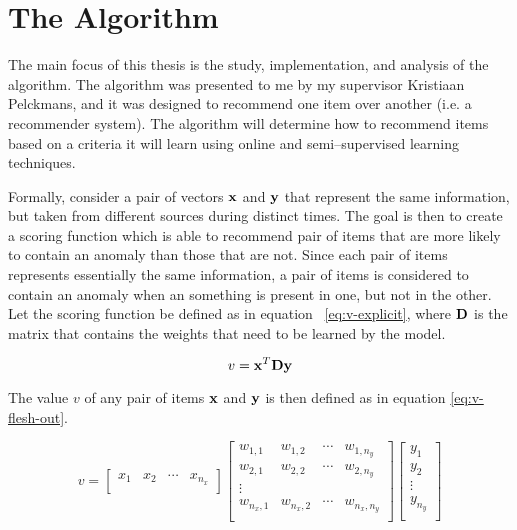 \section{The \mlblink Algorithm} \label{sect:theory:ml-blink}

The main focus of this thesis is the study, implementation, and analysis of the \mlblink algorithm. The \mlblink algorithm was presented to me by my supervisor Kristiaan Pelckmans, and it was designed to recommend one item over another (i.e. a recommender system). The \mlblink algorithm will determine how to recommend items based on a criteria it will learn using online and semi--supervised learning techniques.

Formally, consider a pair of vectors $\boldsymbol{\mathbf{x}}$ and $\boldsymbol{\mathbf{y}}$ that represent the same information, but taken from different sources during distinct times. The goal is then to create a scoring function which is able to recommend pair of items that are more likely to contain an anomaly than those that are not. Since each pair of items represents essentially the same information, a pair of items is considered to contain an anomaly when an something is present in one, but not in the other. Let the scoring function be defined as in equation ~\ref{eq:v-explicit}, where $\boldsymbol{\mathbf{D}}$ is the matrix that contains the weights that need to be learned by the model.

\begin{equation} \label{eq:v-explicit}
  v = \boldsymbol{\mathbf{x}}^T \boldsymbol{\mathbf{D}} \boldsymbol{\mathbf{y}}  
\end{equation}

The value $v$ of any pair of items $\boldsymbol{\mathbf{x}}$ and $\boldsymbol{\mathbf{y}}$ is then defined as in equation \ref{eq:v-flesh-out}.

\begin{equation} \label{eq:v-flesh-out}
    v = 
    \begin{bmatrix}
        x_{1} & x_{2} & \cdots & x_{n_x} \\
    \end{bmatrix}
    \begin{bmatrix}
        w_{1,1} & w_{1,2} & \cdots & w_{1,n_y} \\
        w_{2,1} & w_{2,2} & \cdots & w_{2,n_y} \\
        \vdots \\
        w_{n_x,1} & w_{n_x,2} & \cdots & w_{n_x,n_y} \\
    \end{bmatrix}
    \begin{bmatrix}
        y_{1} \\
        y_{2} \\
        \vdots  \\
        y_{n_y} \\
    \end{bmatrix}
\end{equation}


